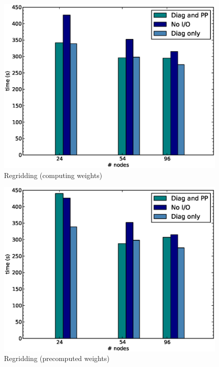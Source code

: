 \normalsize
\begin{figure}[ht!]
  \begin{center}
   \includegraphics[scale=0.4]{figs/regrid.eps}
   \caption{Regridding (computing weights)}
   \label{fig:fig2}
  \end{center}
\end{figure}

\begin{figure}[ht!]
  \begin{center}
   \includegraphics[scale=0.4]{figs/regrid_pcw.eps}
   \caption{Regridding (precomputed weights)}
   \label{fig:fig3}
  \end{center}
\end{figure}

